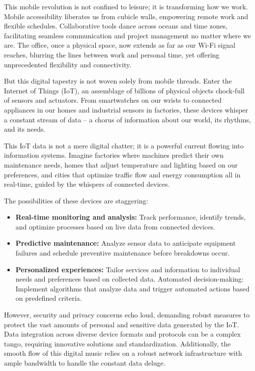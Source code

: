 \documentclass[
  letterpaper,
  DIV=11,
  numbers=noendperiod]{scrreprt}
\providecommand{\tightlist}{%
  \setlength{\itemsep}{0pt}\setlength{\parskip}{0pt}}\usepackage{longtable,booktabs,array}
\begin{document}
This mobile revolution is not confined to leisure; it is transforming
how we work. Mobile accessibility liberates us from cubicle walls,
empowering remote work and flexible schedules. Collaborative tools dance
across oceans and time zones, facilitating seamless communication and
project management no matter where we are. The office, once a physical
space, now extends as far as our Wi-Fi signal reaches, blurring the
lines between work and personal time, yet offering unprecedented
flexibility and connectivity.

But this digital tapestry is not woven solely from mobile threads. Enter
the Internet of Things (IoT), an assemblage of billions of physical
objects chock-full of sensors and actuators. From smartwatches on our
wrists to connected appliances in our homes and industrial sensors in
factories, these devices whisper a constant stream of data -- a chorus
of information about our world, its rhythms, and its needs.

This IoT data is not a mere digital chatter; it is a powerful current
flowing into information systems. Imagine factories where machines
predict their own maintenance needs, homes that adjust temperature and
lighting based on our preferences, and cities that optimize traffic flow
and energy consumption all in real-time, guided by the whispers of
connected devices.

The possibilities of these devices are staggering:

\begin{itemize}
\tightlist
\item
  \textbf{Real-time monitoring and analysis:} Track performance,
  identify trends, and optimize processes based on live data from
  connected devices.
\item
  \textbf{Predictive maintenance:} Analyze sensor data to anticipate
  equipment failures and schedule preventive maintenance before
  breakdowns occur.
\item
  \textbf{Personalized experiences:} Tailor services and information to
  individual needs and preferences based on collected data. Automated
  decision-making: Implement algorithms that analyze data and trigger
  automated actions based on predefined criteria.
\end{itemize}

However, security and privacy concerns echo loud, demanding robust
measures to protect the vast amounts of personal and sensitive data
generated by the IoT. Data integration across diverse device formats and
protocols can be a complex tango, requiring innovative solutions and
standardization. Additionally, the smooth flow of this digital music
relies on a robust network infrastructure with ample bandwidth to handle
the constant data deluge.
\end{document}
